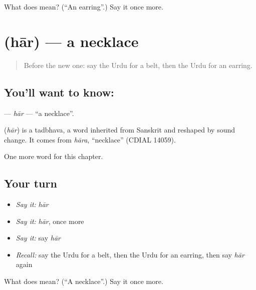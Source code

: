 \begin{tcolorbox}[breakable,colback=teal!4,colframe=teal!35!black,title={Before you move on}]
What does  mean? (\textquotedblleft{}An earring\textquotedblright{}.) Say it once more.
\end{tcolorbox}
\section[\texorpdfstring{\ur{ہار} (hār)}{ہار (hār)}]{ (hār) — a necklace}

\label{lesson:UR-C166-har}



\begin{quote}
Before the new one: say the Urdu for a belt, then the Urdu for an earring.
\end{quote}

\subsection*{You'll want to know: }
\textbf{} — \emph{hār} — \textquotedblleft{}a necklace\textquotedblright{}.

\begin{cousinweb}
\textbf{} (\emph{hār}) is a tadbhava, a word inherited from Sanskrit and reshaped by sound change. It comes from \emph{hāra}, \textquotedblleft{}necklace\textquotedblright{} (CDIAL 14059).
\end{cousinweb}

\begin{grammarlens}[title={What you've built}]
One more word for this chapter.
\end{grammarlens}

\subsection*{Your turn}
\begin{itemize}
\raggedright
  \item \emph{Say it:} \emph{hār}
  \item \emph{Say it:} \emph{hār}, once more
  \item \emph{Say it:} say \emph{hār}
  \item \emph{Recall:} say the Urdu for a belt, then the Urdu for an earring, then say \emph{hār} again
\end{itemize}

\begin{tcolorbox}[breakable,colback=teal!4,colframe=teal!35!black,title={Before you move on}]
What does  mean? (\textquotedblleft{}A necklace\textquotedblright{}.) Say it once more.
\end{tcolorbox}

